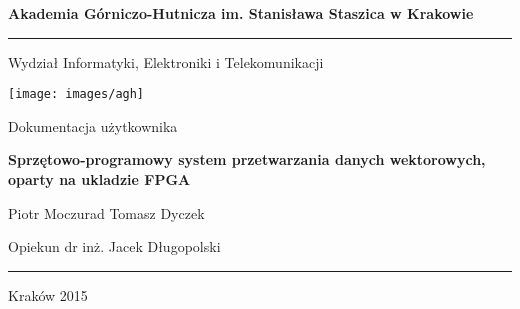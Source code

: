 \begin{titlepage}
    \begin{center}

        \textbf{Akademia Górniczo-Hutnicza im. Stanisława Staszica w Krakowie}
        \rule{\textwidth}{1pt}\par
        \vspace{0.5cm}
        Wydział Informatyki, Elektroniki i Telekomunikacji
        
        \vspace{1.5cm}

        \texttt{[image: images/agh]}
 		
 		\vspace{1.5cm}
 		
 		Dokumentacja użytkownika
 		
 		\vspace{0.5cm}
	 	\textbf{Sprzętowo-programowy system przetwarzania danych wektorowych, oparty na ukladzie FPGA}
		
		Piotr Moczurad
		Tomasz Dyczek
		
		Opiekun
		dr inż. Jacek Długopolski
		\rule{\textwidth}{1pt}\par
		Kraków 2015
		
        
    \end{center}
\end{titlepage}
